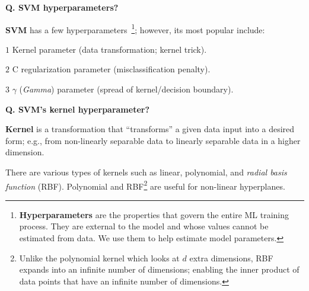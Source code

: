 \begin{frame}[fragile]{\textbf{Q. SVM hyperparameters?}}
  \vspace{.4em}
  \begin{wideitemize}
  \item \textbf{SVM} has a few hyperparameters~\footnote{\textbf{Hyperparameters}
      are the properties that govern the entire ML training process. They are
      external to the model and whose values cannot be estimated from data. We
      use them to help estimate model parameters.}; however, its most popular include:\vspace{.4em}
    \begin{wideitemize}
    \item[$1$] Kernel parameter (data transformation; kernel trick).
    \item[$2$] C regularization parameter (misclassification penalty).
    \item[$3$] $\gamma$ (\textit{Gamma}) parameter (spread of kernel/decision boundary).
    \end{wideitemize}
  \end{wideitemize}

\end{frame}

\begin{frame}[fragile]{\textbf{Q. SVM's kernel hyperparameter?}}
  \vspace{.4em}
  \begin{wideitemize}
  \item \textbf{Kernel} is a transformation that ``transforms'' a given
    data input into a desired form; e.g., from non-linearly separable data to
    linearly separable data {\footnotesize in a higher dimension}.
    \item There are various types of kernels such as linear, polynomial, and
      \textit{radial basis function} (RBF). Polynomial and RBF\footnote{Unlike
        the polynomial kernel which looks at $d$ extra dimensions, RBF expands
        into an infinite number of dimensions; enabling the inner product of
        data points that have an infinite number of dimensions.} are useful for
      non-linear hyperplanes.
  \end{wideitemize}
\end{frame}


